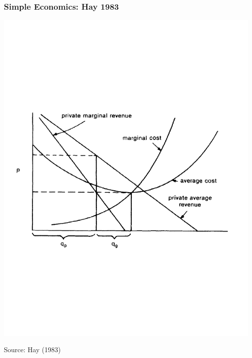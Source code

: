 \documentclass[ucs,9pt]{beamer}
\begin{document}
\begin{frame}
\frametitle{Simple Economics: Hay 1983}
\pause
\begin{center}
\includegraphics[scale=0.5]{hay}
\end{center}
\tiny Source: Hay (1983)
\end{frame}




\end{document}

